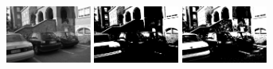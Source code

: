 \documentclass{article}
\begin{document}
\begin{figure}[htb]

\begin{minipage}[b]{.3\linewidth}
  \centering
  \centerline{\includegraphics[width=2.8cm]{./Figs/leuven1}}
\end{minipage}
\hfill
\begin{minipage}[b]{0.3\linewidth}
  \centering
  \centerline{\includegraphics[width=2.8cm]{./Figs/leuven1_otsu}}
\end{minipage}
\hfill
\begin{minipage}[b]{0.3\linewidth}
  \centering
  \centerline{\includegraphics[width=2.8cm]{./Figs/leuven1_numcc}}
\end{minipage}


\end{figure}
\end{document}
